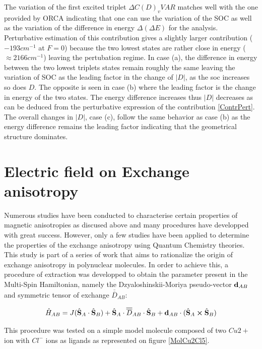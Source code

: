 \documentclass[10pt]{report}
\numberwithin{equation}{section}
\begin{document}
The variation of the first excited triplet $\Delta C(D)_v{VAR}$ matches well with the one provided by ORCA indicating that one can use the variation of the SOC as well as the variation of the difference in energy $\Delta (\Delta E)$ for the analysis.
Perturbative estimation of this contribution gives a slightly larger contribution ($-193 cm^{-1}$ at $F=0$) because the two lowest states are rather close in energy ($\approx 2166 cm^{-1}$) leaving the pertubation regime.
In case (a), the difference in energy between the two lowest triplets states remain roughly the same leaving the variation of SOC as the leading factor in the change of $|D|$, as the soc increases so does $D$.
The opposite is seen in case (b) where the leading factor is the change in energy of the two states. 
The energy difference increases thus $|D|$ decreases as can be deduced from the perturbative expression of the contribution \ref{ContrPert}.
The overall changes in $|D|$, case (c), follow the same behavior as case (b) as the energy difference remains the leading factor indicating that the geometrical structure dominates.

\chapter{Electric field on Exchange anisotropy}\label{chap:Cu2Cl5}

Numerous studies have been conducted to characterise certain properties of magnetic anisotropies as discused above and many procedures have developped with great success. 
However, only a few studies have been applied to determine the properties of the exchange anisotropy using Quantum Chemistry theories.
This study is part of a series of work that aims to rationalize the origin of exchange anisotropy in polynuclear molecules.
In order to achieve this, a procedure of extraction was developped to obtain the parameter present in the Multi-Spin Hamiltonian, namely the Dzyaloshinskii-Moriya pseudo-vector $\vb{d}_{AB}$ and symmetric tensor of exchange $\overline{\overline{D}}_{AB}$:

\begin{equation}
        \hat{H}_{AB}=J(\hat{\vb S}_A \cdot \hat{\vb S}_B) + \hat{\vb S}_A \cdot\overline{\overline{D}}_{AB} \cdot \hat{\vb S}_B + \vb{d}_{AB} \cdot (\hat{\vb S}_A \cross \hat{\vb S}_B)
\end{equation}

This procedure was tested on a simple model molecule composed of two $Cu{2+}$ ion with $Cl^-$ ions as ligands as represented on figure \ref{MolCu2Cl5}. 
\end{document}
